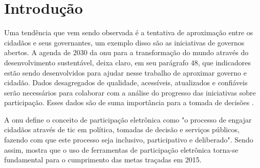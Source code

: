 \chapter[Introdução]{Introdução}
\label{cap:cap1}




\par
Uma tendência que vem sendo observada é a tentativa de aproximação entre os cidadãos e seus governantes, um exemplo disso são as iniciativas de governos abertos.
A agenda de 2030 da \acrfull{onu} para a transformação do mundo através do desenvolvimento sustentável, deixa claro, em seu parágrafo 48, que
indicadores estão sendo desenvolvidos para ajudar nesse trabalho de aproximar governo e cidadão. Dados desagregados de qualidade, acessíveis,
atualizados e confiáveis serão necessários para colaborar com a análise do progresso das iniciativas sobre participação. 
Esses dados são de suma importância para a tomada de decisões \cite{assembly2015transforming}.

\par
A \acrshort{onu} define o conceito de participação eletrônica como "o processo de engajar cidadãos através de \acrfull{tic} em política, tomadas de decisão e
serviços públicos, fazendo com que este processo seja inclusivo, participativo e deliberado". Sendo assim,  mostra
que o uso de ferramentas de participação eletrônica torna-se fundamental para o cumprimento das metas traçadas em 2015. 

